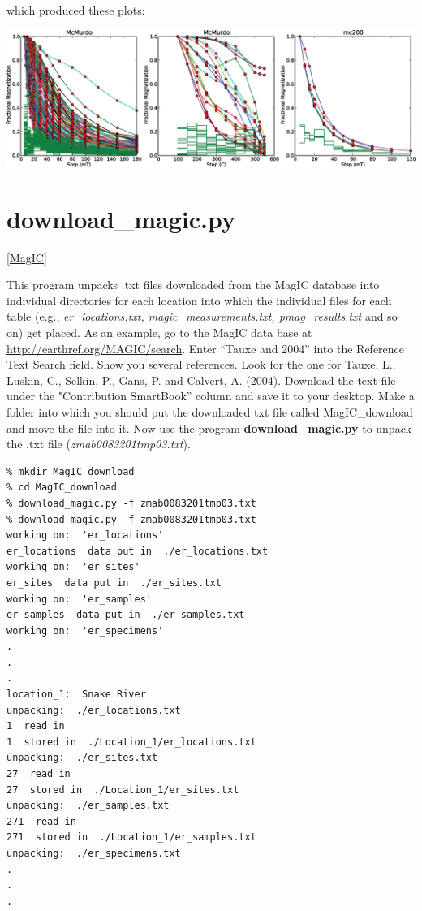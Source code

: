 \documentclass[11pt]{book}
\begin{document}
{{{{\begin{verbatim}
\end{verbatim}

\noindent which produced these plots:

{\hskip 1cm %
\includegraphics[width=20 cm]{EPSfiles/dmag.eps}}

 \section  {\bf download\_magic.py} [\href{http://earthref.org/MagIC}{MagIC}]
 \label{ex:download_magic}
 
 This program unpacks .txt files downloaded from the MagIC database into individual directories for each location into which the individual files for each table (e.g., {\it er\_locations.txt, magic\_measurements.txt, pmag\_results.txt} and so on) get placed.   As an example, go to the MagIC data base at \url{http://earthref.org/MAGIC/search}.  Enter ``Tauxe and 2004'' into the Reference Text Search field. 
 Show you several references.   Look for the one for Tauxe, L., Luskin, C., Selkin, P., Gans, P. and Calvert, A. (2004).  Download the  text file under the "Contribution SmartBook'' column and save it to your desktop.   Make a   folder into which  you should put the downloaded txt file called MagIC\_download and move the file into it.  Now use the program {\bf download\_magic.py} to unpack the .txt file ({\it zmab0083201tmp03.txt}).   
 
 \begin{verbatim}
% mkdir MagIC_download
% cd MagIC_download
% download_magic.py -f zmab0083201tmp03.txt
% download_magic.py -f zmab0083201tmp03.txt 
working on:  'er_locations'
er_locations  data put in  ./er_locations.txt
working on:  'er_sites'
er_sites  data put in  ./er_sites.txt
working on:  'er_samples'
er_samples  data put in  ./er_samples.txt
working on:  'er_specimens'
.
.
.
location_1:  Snake River
unpacking:  ./er_locations.txt
1  read in
1  stored in  ./Location_1/er_locations.txt
unpacking:  ./er_sites.txt
27  read in
27  stored in  ./Location_1/er_sites.txt
unpacking:  ./er_samples.txt
271  read in
271  stored in  ./Location_1/er_samples.txt
unpacking:  ./er_specimens.txt
.
.
.
\end{verbatim}

}}}}
\end{document}
